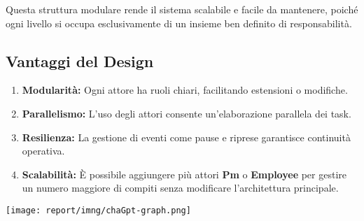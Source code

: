 Questa struttura modulare rende il sistema scalabile e facile da mantenere, poiché ogni livello si occupa esclusivamente di un insieme ben definito di responsabilità.

\subsection*{Vantaggi del Design}
\begin{enumerate}
    \item \textbf{Modularità:} Ogni attore ha ruoli chiari, facilitando estensioni o modifiche.
    \item \textbf{Parallelismo:} L'uso degli attori consente un'elaborazione parallela dei task.
    \item \textbf{Resilienza:} La gestione di eventi come pause e riprese garantisce continuità operativa.
    \item \textbf{Scalabilità:} È possibile aggiungere più attori \textbf{Pm} o \textbf{Employee} per gestire un numero maggiore di compiti senza modificare l'architettura principale.
\end{enumerate}


\texttt{[image: report/imng/chaGpt-graph.png]}\\[0.5cm]